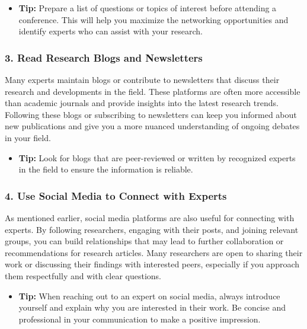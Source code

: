 \documentclass[
]{book}
\providecommand{\tightlist}{%
  \setlength{\itemsep}{0pt}\setlength{\parskip}{0pt}}
\begin{document}
\begin{itemize}
\tightlist
\item
  \textbf{Tip:} Prepare a list of questions or topics of interest before attending a conference. This will help you maximize the networking opportunities and identify experts who can assist with your research.
\end{itemize}

\subsubsection*{3. Read Research Blogs and Newsletters}\label{read-research-blogs-and-newsletters}

Many experts maintain blogs or contribute to newsletters that discuss their research and developments in the field. These platforms are often more accessible than academic journals and provide insights into the latest research trends. Following these blogs or subscribing to newsletters can keep you informed about new publications and give you a more nuanced understanding of ongoing debates in your field.

\begin{itemize}
\tightlist
\item
  \textbf{Tip:} Look for blogs that are peer-reviewed or written by recognized experts in the field to ensure the information is reliable.
\end{itemize}

\subsubsection*{4. Use Social Media to Connect with Experts}\label{use-social-media-to-connect-with-experts}

As mentioned earlier, social media platforms are also useful for connecting with experts. By following researchers, engaging with their posts, and joining relevant groups, you can build relationships that may lead to further collaboration or recommendations for research articles. Many researchers are open to sharing their work or discussing their findings with interested peers, especially if you approach them respectfully and with clear questions.

\begin{itemize}
\tightlist
\item
  \textbf{Tip:} When reaching out to an expert on social media, always introduce yourself and explain why you are interested in their work. Be concise and professional in your communication to make a positive impression.
\end{itemize}
\end{document}
